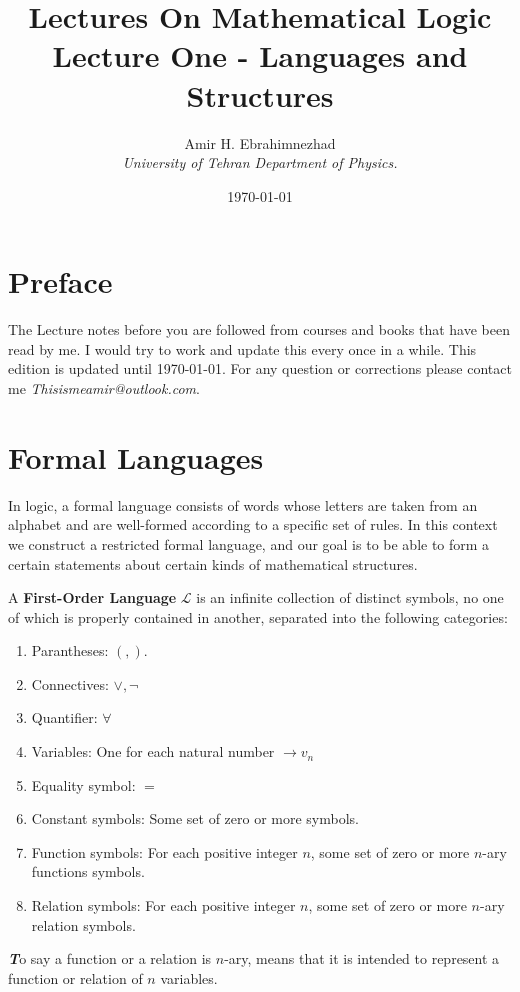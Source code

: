 \documentclass[9pt,a4paper, twocolumn]{article}
\title{Lectures On Mathematical Logic\\ \large Lecture One - Languages and Structures}
\date{\today}
\author{Amir H. Ebrahimnezhad \\ \small \textit{University of Tehran Department of Physics.}}
\newenvironment{callout}
	{\begin{calloutbox}\color{charcoal}\textbf\textit}
	{\end{calloutbox}}
\newcommand{\curveL}{\mathcal{L}}
\begin{document}
    \maketitle
    \section*{Preface}
    The Lecture notes before you are followed from courses and books that have been read by me. I would try to work and update this every once in a while. This edition is updated until \today. For any question or corrections please contact me \textit{Thisismeamir@outlook.com}.
    \section*{Formal Languages}
        In logic, a formal language consists of words whose letters are taken from an alphabet and are well-formed according to a specific set of rules. In this context we construct a restricted formal language, and our goal is to be able to form a certain statements about certain kinds of mathematical structures.
        \begin{define}
            A \textbf{First-Order Language} $\curveL$ is an infinite collection of distinct symbols, no one of which is properly contained in another, separated into the following categories:
            \begin{enumerate}
                \item Parantheses: $(,)$.
                \item Connectives: $\lor, \neg$
                \item Quantifier: $\forall$
                \item Variables: One for each natural number $\rightarrow v_n$
                \item Equality symbol: $=$
                \item Constant symbols: Some set of zero or more symbols.
                \item Function symbols: For each positive integer $n$, some set of zero or more $n$-ary functions symbols.
                \item Relation symbols: For each positive integer $n$, some set of zero or more $n$-ary relation symbols.
            \end{enumerate}
        \end{define}
        \begin{callout}
            To say a function or a relation is $n$-ary, means that it is intended to represent a function or relation of $n$ variables.
        \end{callout}
\end{document}
